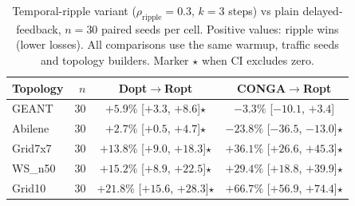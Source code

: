 \begin{table}[t]
\centering
\small
\caption{Temporal-ripple variant ($\rho_{\mathrm{ripple}}{=}0.3$, $k{=}3$ steps) vs plain delayed-feedback, $n=30$ paired seeds per cell. Positive values: ripple wins (lower losses). All comparisons use the same warmup, traffic seeds and topology builders. Marker $\star$ when CI excludes zero.}
\label{tab:ripple}
\begin{tabular}{lrcc}
\toprule
Topology & $n$ & Dopt$\to$Ropt & CONGA$\to$Ropt \\
\midrule
GEANT & 30 & $+5.9\%$ [$+3.3$, $+8.6$]$\star$ & $-3.3\%$ [$-10.1$, $+3.4$] \\
Abilene & 30 & $+2.7\%$ [$+0.5$, $+4.7$]$\star$ & $-23.8\%$ [$-36.5$, $-13.0$]$\star$ \\
Grid7x7 & 30 & $+13.8\%$ [$+9.0$, $+18.3$]$\star$ & $+36.1\%$ [$+26.6$, $+45.3$]$\star$ \\
WS\_n50 & 30 & $+15.2\%$ [$+8.9$, $+22.5$]$\star$ & $+29.4\%$ [$+18.8$, $+39.9$]$\star$ \\
Grid10 & 30 & $+21.8\%$ [$+15.6$, $+28.3$]$\star$ & $+66.7\%$ [$+56.9$, $+74.4$]$\star$ \\
\bottomrule
\end{tabular}
\end{table}
